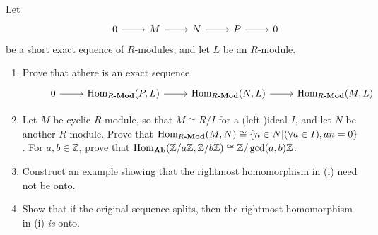 \documentclass[12pt]{article}
\newenvironment{problem}[2][Problem]{\begin{trivlist}
\item[\hskip \labelsep {\bfseries #1}\hskip \labelsep {\bfseries #2.}]}{\end{trivlist}}
\newcommand{\catname}[1]{\normalfont\textbf{#1}}
\newcommand{\Hom}{\text{Hom}}
\newcommand{\Homc}[2]{\Hom_{\catname{#1}}(#2)}
\newcommand{\Homod}[2]{\Hom_{#1\catname{-Mod}}(#2)}
\newcommand{\Z}{\mathbb{Z}}
\theoremstyle{remark}
\begin{document}
\begin{problem}{7.7}
  Let
  \[
    \begin{tikzcd}
      &0 \ar[r] &M \ar[r] &N \ar[r] &P \ar[r] &0
    \end{tikzcd}
  \]
  be a short exact equence of $R$-modules, and let $L$ be an $R$-module.
  \begin{enumerate}[label=(\roman*)]
    \item Prove that athere is an exact sequence \\
      \[
        \begin{tikzcd}
          &0 \ar[r] &\Homod{R}{P,L} \ar[r] &\Homod{R}{N, L} \ar[r] &\Homod{R}{M, L}
        \end{tikzcd}
      \]

    \item Let $M$ be  cyclic $R$-module, so that $M\cong R/I$ for a (left-)ideal $I$, and let
      $N$ be another $R$-module.
      Prove that $\Homod{R}{M, N}\cong \{n\in N | (\forall a\in I),an=0\}$.
      For $a,b\in\Z$, prove that $\Homc{Ab}{\Z/a\Z,\Z/b\Z}\cong\Z/\gcd(a,b)\Z$.

    \item Construct an example showing that the rightmost homomorphism in (i) need not be onto.
    \item Show that if the original sequence splits, then the rightmost homomorphism in (i)
      \textit{is} onto.
  \end{enumerate}
\end{problem}
\end{document}
